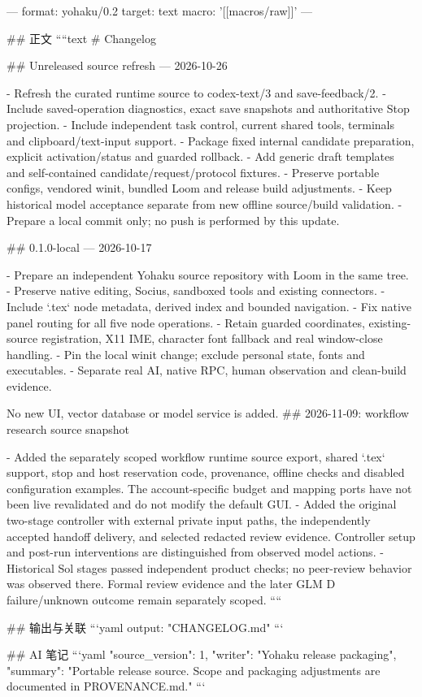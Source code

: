 ---
format: yohaku/0.2
target: text
macro: '[[macros/raw]]'
---

## 正文
````text
# Changelog

## Unreleased source refresh — 2026-10-26

- Refresh the curated runtime source to codex-text/3 and save-feedback/2.
- Include saved-operation diagnostics, exact save snapshots and authoritative Stop projection.
- Include independent task control, current shared tools, terminals and clipboard/text-input support.
- Package fixed internal candidate preparation, explicit activation/status and guarded rollback.
- Add generic draft templates and self-contained candidate/request/protocol fixtures.
- Preserve portable configs, vendored winit, bundled Loom and release build adjustments.
- Keep historical model acceptance separate from new offline source/build validation.
- Prepare a local commit only; no push is performed by this update.

## 0.1.0-local — 2026-10-17

- Prepare an independent Yohaku source repository with Loom in the same tree.
- Preserve native editing, Socius, sandboxed tools and existing connectors.
- Include `.tex` node metadata, derived index and bounded navigation.
- Fix native panel routing for all five node operations.
- Retain guarded coordinates, existing-source registration, X11 IME,
  character font fallback and real window-close handling.
- Pin the local winit change; exclude personal state, fonts and executables.
- Separate real AI, native RPC, human observation and clean-build evidence.

No new UI, vector database or model service is added.
## 2026-11-09: workflow research source snapshot

- Added the separately scoped workflow runtime source export, shared `.tex` support, stop and host reservation code, provenance, offline checks and disabled configuration examples. The account-specific budget and mapping ports have not been live revalidated and do not modify the default GUI.
- Added the original two-stage controller with external private input paths, the independently accepted handoff delivery, and selected redacted review evidence. Controller setup and post-run interventions are distinguished from observed model actions.
- Historical Sol stages passed independent product checks; no peer-review behavior was observed there. Formal review evidence and the later GLM D failure/unknown outcome remain separately scoped.
````

## 输出与关联
```yaml
output: "CHANGELOG.md"
```

## AI 笔记
```yaml
{"source_version": 1, "writer": "Yohaku release packaging", "summary": "Portable release source. Scope and packaging adjustments are documented in PROVENANCE.md."}
```
